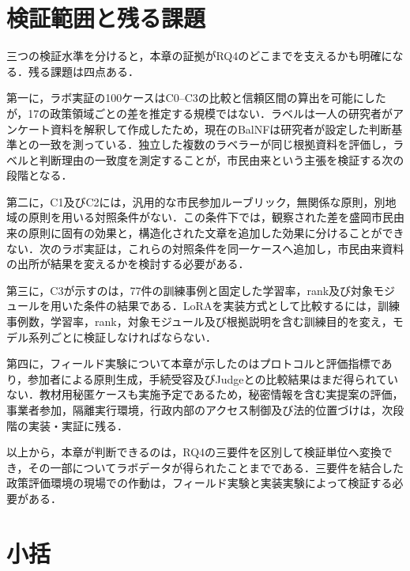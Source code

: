 \section{検証範囲と残る課題}
\label{sec:ch8_limitations}

三つの検証水準を分けると，本章の証拠がRQ4のどこまでを支えるかも明確になる．残る課題は四点ある．

第一に，ラボ実証の100ケースはC0--C3の比較と信頼区間の算出を可能にしたが，17の政策領域ごとの差を推定する規模ではない．ラベルは一人の研究者がアンケート資料を解釈して作成したため，現在のBalNFは研究者が設定した判断基準との一致を測っている．独立した複数のラベラーが同じ根拠資料を評価し，ラベルと判断理由の一致度を測定することが，市民由来という主張を検証する次の段階となる．

第二に，C1及びC2には，汎用的な市民参加ルーブリック，無関係な原則，別地域の原則を用いる対照条件がない．この条件下では，観察された差を盛岡市民由来の原則に固有の効果と，構造化された文章を追加した効果に分けることができない．次のラボ実証は，これらの対照条件を同一ケースへ追加し，市民由来資料の出所が結果を変えるかを検討する必要がある．

第三に，C3が示すのは，77件の訓練事例と固定した学習率，rank及び対象モジュールを用いた条件の結果である．LoRAを実装方式として比較するには，訓練事例数，学習率，rank，対象モジュール及び根拠説明を含む訓練目的を変え，モデル系列ごとに検証しなければならない．

第四に，フィールド実験について本章が示したのはプロトコルと評価指標であり，参加者による原則生成，手続受容及びJudgeとの比較結果はまだ得られていない．教材用秘匿ケースも実施予定であるため，秘密情報を含む実提案の評価，事業者参加，隔離実行環境，行政内部のアクセス制御及び法的位置づけは，次段階の実装・実証に残る．

以上から，本章が判断できるのは，RQ4の三要件を区別して検証単位へ変換でき，その一部についてラボデータが得られたことまでである．三要件を結合した政策評価環境の現場での作動は，フィールド実験と実装実験によって検証する必要がある．

\section{小括}
\label{sec:ch8_summary}

